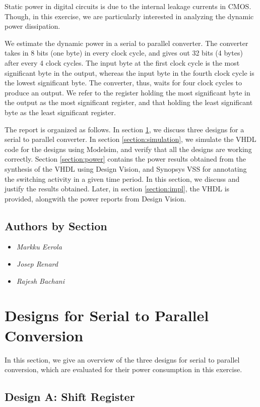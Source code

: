 \documentclass[11pt,a4paper]{article}
\begin{document}
Static power in digital circuits is due to the internal leakage currents in CMOS. Though, in this exercise, we are particularly interested in analyzing the dynamic power dissipation.

We estimate the dynamic power in a serial to parallel converter. The converter takes in 8 bits (one byte) in every clock cycle, and gives out 32 bits (4 bytes) after every 4 clock cycles. The input byte at the first clock cycle is the most significant byte in the output, whereas the input byte in the fourth clock cycle is the lowest significant byte. The converter, thus, waits for four clock cycles to produce an output. We refer to the register holding the most significant byte in the output as the most significant register, and that holding the least significant byte as the least significant register.

The report is organized as follows. In section \ref{section:designs}, we discuss three designs for a serial to parallel converter. In section \ref{section:simulation}, we simulate the VHDL code for the designs using Modelsim, and verify that all the designs are working correctly. Section \ref{section:power} contains the power results obtained from the synthesis of the VHDL using Design Vision, and Synopsys VSS for annotating the switching activity in a given time period. In this section, we discuss and justify the results obtained. Later, in section \ref{section:impl}, the VHDL is provided, alongwith the power reports from Design Vision. 

\subsection{Authors by Section}
\begin{itemize}
\item \textit{Markku Eerola} 
\item \textit{Josep Renard} 
\item \textit{Rajesh Bachani} 
\end{itemize}

\newpage
\section{Designs for Serial to Parallel Conversion}
\label{section:designs}
In this section, we give an overview of the three designs for serial to parallel conversion, which are evaluated for their power consumption in this exercise.

\subsection{Design A: Shift Register}
\end{document}
